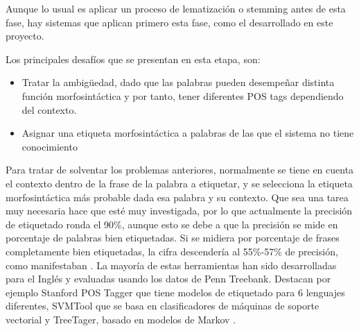 Aunque lo usual es aplicar un proceso de lematización o stemming antes de esta fase, hay sistemas que aplican primero esta fase, como el desarrollado en este proyecto.\newline

Los principales desafíos que se presentan en esta etapa, son: 
\begin{itemize}
\item Tratar la ambigüedad, dado que las palabras pueden desempeñar distinta función morfosintáctica y por tanto, tener diferentes POS tags dependiendo del contexto. 
\item Asignar una etiqueta morfosintáctica a palabras de las que el sistema no tiene conocimiento
\end{itemize}  
Para tratar de solventar los problemas anteriores, normalmente se tiene en cuenta el contexto dentro de la frase de la palabra a etiquetar, y se selecciona la etiqueta morfosintáctica más probable dada esa palabra y su contexto. \newline
Que sea una tarea muy necesaria hace que esté muy investigada, por lo que actualmente la precisión de etiquetado ronda el 90\%, aunque esto se debe a que la precisión se mide en porcentaje de palabras bien etiquetadas. Si se midiera por porcentaje de frases completamente bien etiquetadas, la cifra descendería al 55\%-57\% de precisión, como manifestaban \citet{giesbrecht2009part}. \newline
La mayoría de estas herramientas han sido desarrolladas para el Inglés y evaluadas usando los datos de \textsf{Penn Treebank}. Destacan por ejemplo \textsf{Stanford POS Tagger} que tiene modelos de etiquetado para 6 lenguajes diferentes, \textsf{SVMTool} \citet{gimenez2004svmtool} que se basa en clasificadores de máquinas de soporte vectorial  y \textsf{TreeTager}, basado en modelos de Markov \citet{schmid1995treetagger}. 
